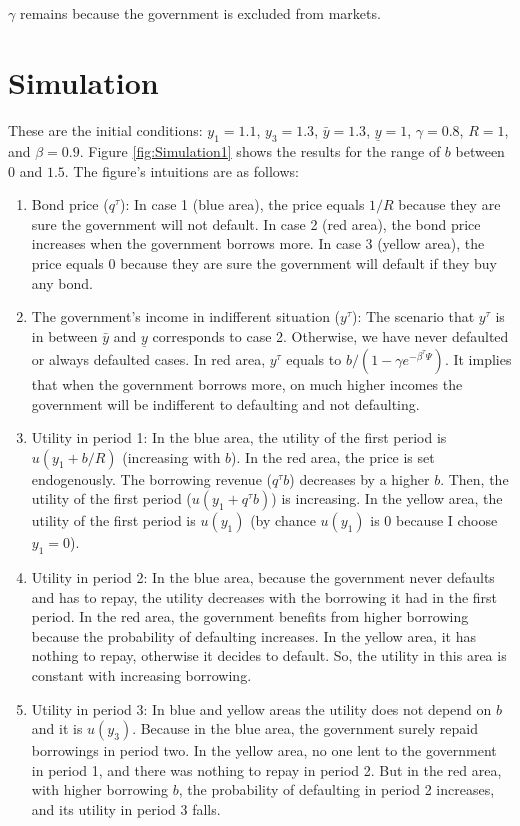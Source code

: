 \documentclass{article}
\begin{document}
$\gamma$ remains because the government is excluded from markets.

\section{Simulation}

These are the initial conditions: $y_1 = 1.1$, $y_3 = 1.3$, $\bar{y} = 1.3$, $\underline{y} = 1$, $\gamma = 0.8$, $R = 1$, and $\beta = 0.9$. Figure \ref{fig:Simulation1} shows the results for the range of $b$ between $0$ and $1.5$. The figure's intuitions are as follows:
\begin{enumerate}
    \item Bond price ($q^\tau$): In case 1 (blue area), the price equals $1/R$ because they are sure the government will not default. In case 2 (red area), the bond price increases when the government borrows more. In case 3 (yellow area), the price equals $0$ because they are sure the government will default if they buy any bond.
    \item The government's income in indifferent situation ($y^\tau$): The scenario that $y^\tau$ is in between $\bar{y}$ and $\underline{y}$ corresponds to case 2. Otherwise, we have never defaulted or always defaulted cases. In red area, $y^\tau$ equals to $ b/(1 - \gamma e^{- \beta^\tau \Psi})$. It implies that when the government borrows more, on much higher incomes the government will be indifferent to defaulting and not defaulting. 
    \item Utility in period 1: In the blue area, the utility of the first period is $u(y_1 + b/R)$ (increasing with $b$). In the red area, the price is set endogenously. The borrowing revenue ($q^\tau b$) decreases by a higher $b$. Then, the utility of the first period ($u(y_1 + q^\tau b)$) is increasing. In the yellow area, the utility of the first period is $u(y_1)$ (by chance $u(y_1)$ is 0 because I choose $y_1 = 0$). 
    \item Utility in period 2: In the blue area, because the government never defaults and has to repay, the utility decreases with the borrowing it had in the first period. In the red area, the government benefits from higher borrowing because the probability of defaulting increases. In the yellow area, it has nothing to repay, otherwise it decides to default. So, the utility in this area is constant with increasing borrowing.
    \item Utility in period 3: In blue and yellow areas the utility does not depend on $b$ and it is $u(y_3)$. Because in the blue area, the government surely repaid borrowings in period two. In the yellow area, no one lent to the government in period 1, and there was nothing to repay in period 2. But in the red area, with higher borrowing $b$, the probability of defaulting in period 2 increases, and its utility in period 3 falls. 

\end{enumerate}
\end{document}
